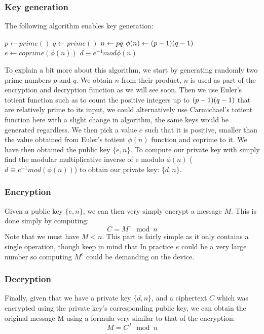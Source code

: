 \documentclass[conference]{IEEEtran}
\begin{document}
\subsubsection{Key generation}
The following algorithm enables key generation:
\begin{algorithmic}
\STATE $p \leftarrow prime()$
\STATE $q \leftarrow prime()$
\STATE $n \leftarrow p \* q$
\STATE $\phi (n) \leftarrow (p - 1) \* (q - 1)$
\STATE $e \leftarrow coprime(\phi (n))$
\STATE $d \equiv e^{-1} mod \phi(n)$
\end{algorithmic}
To explain a bit more about this algorithm, we start by generating randomly two prime numbers
$p$ and $q$. We obtain $n$ from their product, $n$ is used as part of the encryption and decryption function
as we will see soon. Then we use Euler's totient function such as to count the positive integers
up to $(p - 1) \* (q - 1)$ that are relatively prime to its input, we could alternatively use Carmichael's totient function here 
with a slight change in algorithm, the same keys would be generated regardless. We then pick a value $e$
such that it is positive, smaller than the value obtained from Euler's totient $\phi(n) $ function and coprime to it.
We have then obtained the public key $\{e,n\}$. To compute our private key with simply find 
the modular multiplicative inverse of e modulo $\phi(n)$ ($d \equiv e^{-1} mod(\phi(n))$) to obtain
our private key: $\{d,n\}$.

\subsubsection{Encryption}
Given a public key $\{e,n\}$, we can then very simply encrypt a message $M$.
This is done simply by computing:
\begin{equation*}
    C = M^{e}\mod n
\end{equation*}
Note that we must have $M \lt n$.
This part is fairly simple as it only contains a single operation, though keep in mind that
In practice $e$ could be a very large number so computing $M^{e}$ could be demanding on the device.

\subsubsection{Decryption}
Finally, given that we have a private key $\{d,n\}$, and a ciphertext $C$
which was encrypted using the private key's corresponding public key, we can obtain the original
message M using a formula very similar to that of the encryption:
\begin{equation*}
    M = C^{d}\mod n
\end{equation*}
\end{document}

